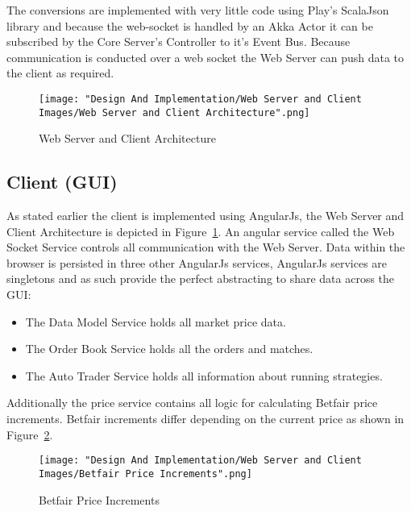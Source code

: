 		The conversions are implemented with very little code using Play's ScalaJson library and because the web-socket is handled by an Akka Actor it can be subscribed by the Core Server's Controller to it's Event Bus. Because communication is conducted over a web socket the Web Server can push data to the client as required.
		
			\begin{figure}[H]
				\texttt{[image: "Design And Implementation/Web Server and Client Images/Web Server and Client Architecture".png]}
				\centering
				\caption{Web Server and Client Architecture}
    				\label{fig:webServerClientArchitecture}
			\end{figure}		
		
	\subsection{Client (GUI)}
		As stated earlier the client is implemented using AngularJs, the Web Server and Client Architecture is depicted in Figure~\ref{fig:webServerClientArchitecture}. An angular service called the Web Socket Service controls all communication with the Web Server. Data within the browser is persisted in three other AngularJs services, AngularJs services are singletons and as such provide the perfect abstracting to share data across the GUI:
		
		\begin{itemize}
			\item The Data Model Service holds all market price data.
			\item The Order Book Service holds all the orders and matches.
			\item The Auto Trader Service holds all information about running strategies.		
		\end{itemize}
	
		Additionally the price service contains all logic for calculating Betfair price increments. Betfair increments differ depending on the current price as shown in Figure~\ref{fig:betfairPriceIncrements}.
		
			\begin{figure}[H]
				\texttt{[image: "Design And Implementation/Web Server and Client Images/Betfair Price Increments".png]}
				\centering
				\caption{Betfair Price Increments}
    				\label{fig:betfairPriceIncrements}
			\end{figure}	
			
